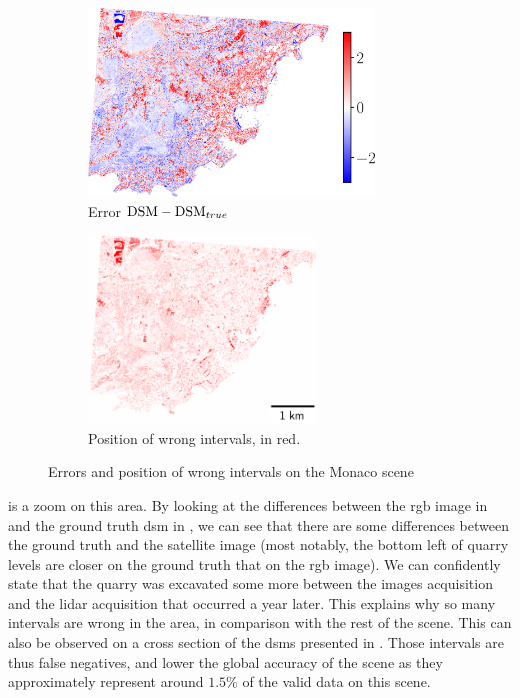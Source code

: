 \begin{figure}
    \begin{subfigure}[t]{0.495\linewidth}
        \flushleft
        \includegraphics[height=5cm]{Images/Chap_6/Monaco_errors.png}
        \caption{Error $\mathrm{DSM}-\mathrm{DSM}_{true}$}
        \label{fig:Monaco_errors}
    \end{subfigure}
    \begin{subfigure}[t]{0.495\linewidth}
        \flushright
        \includegraphics[height=5cm]{Images/Chap_6/Monaco_wrong_intervals.png}
        \caption{Position of wrong intervals, in red.}
        \label{fig:Monaco_wrong_intervals}
    \end{subfigure}
    \caption{Errors and position of wrong intervals on the Monaco scene}
    \label{fig:Monaco_errors_global}
\end{figure}

 is a zoom on this area. By looking at the differences between the \acrshort{rgb} image in  and the ground truth \acrshort{dsm} in , we can see that there are some differences between the ground truth and the satellite image (most notably, the bottom left of quarry levels are closer on the ground truth that on the \acrshort{rgb} image). We can confidently state that the quarry was excavated some more between the images acquisition and the \acrshort{lidar} acquisition that occurred a year later. This explains why so many intervals are wrong in the area, in comparison with the rest of the scene. This can also be observed on a cross section of the \acrshort{dsm}s presented in . Those intervals are thus false negatives, and lower the global accuracy of the scene as they approximately represent around $1.5\%$ of the valid data on this scene.

